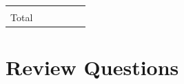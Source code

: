 \documentclass[]{book}
\theoremstyle{definition}
\theoremstyle{definition}
\theoremstyle{definition}
\theoremstyle{remark}
\begin{document}
\begin{longtable}[]{@{}clllll@{}}
\begin{minipage}[t]{0.19\columnwidth}
\end{minipage} & \begin{minipage}[t]{0.19\columnwidth}\raggedright\strut
\strut
\end{minipage} & \begin{minipage}[t]{0.19\columnwidth}\raggedright\strut
\strut
\end{minipage} & \begin{minipage}[t]{0.04\columnwidth}\raggedright\strut
\strut
\end{minipage}\tabularnewline
\begin{minipage}[t]{0.05\columnwidth}\centering\strut
Total\strut
\end{minipage} & \begin{minipage}[t]{0.19\columnwidth}\raggedright\strut
\strut
\end{minipage} & \begin{minipage}[t]{0.19\columnwidth}\raggedright\strut
\strut
\end{minipage} & \begin{minipage}[t]{0.19\columnwidth}\raggedright\strut
\strut
\end{minipage} & \begin{minipage}[t]{0.19\columnwidth}\raggedright\strut
\strut
\end{minipage} & \begin{minipage}[t]{0.04\columnwidth}\raggedright\strut
\strut
\end{minipage}\tabularnewline
\bottomrule
\end{longtable}

\section{Review Questions}\label{review-questions-2}
\end{document}
